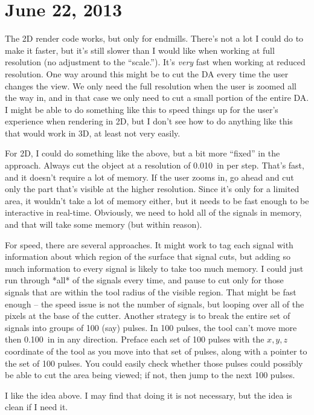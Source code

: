 \documentclass[titlepage,oneside,10pt]{article}
\begin{document}
\section{June 22, 2013}

The 2D render code works, but only for endmills. There's not a lot I
could do to make it faster, but it's still slower than I would like
when working at full resolution (no adjustment to the
``scale.''). It's \emph{very} fast when working at reduced resolution. One
way around this might be to cut the DA every time the user changes the
view. We only need the full resolution when the user is zoomed all the
way in, and in that case we only need to cut a small portion of the
entire DA. I might be able to do something like this to speed things
up for the user's experience when rendering in 2D, but I don't see how
to do anything like this that would work in 3D, at least not very
easily.

For 2D, I could do something like the above, but a bit more ``fixed''
in the approach. Always cut the object at a resolution of 0.010~in per
step. That's fast, and it doesn't require a lot of memory. If the user
zooms in, go ahead and cut only the part that's visible at the higher
resolution. Since it's only for a limited area, it wouldn't take a lot
of memory either, but it needs to be fast enough to be interactive in
real-time. Obviously, we need to hold all of the signals in memory,
and that will take some memory (but within reason). 

For speed, there are several approaches. It might work to tag each
signal with information about which region of the surface that signal
cuts, but adding so much information to every signal is likely to take
too much memory. I could just run through *all* of the signals every
time, and pause to cut only for those signals that are within the tool
radius of the visible region. That might be fast enough -- the speed
issue is not the number of signals, but looping over all of the pixels
at the base of the cutter. Another strategy is to break the entire set of
signals into groups of 100 (say) pulses. In 100 pulses, the tool can't
move more then 0.100~in in any direction. Preface each set of 100
pulses with the $x,y,z$ coordinate of the tool as you move into that
set of pulses, along with a pointer to the set of 100 pulses. You
could easily check whether those pulses could possibly be able to cut
the area being viewed; if not, then jump to the next 100 pulses.

I like the idea above. I may find that doing it is not necessary, but
the idea is clean if I need it.
\end{document}
